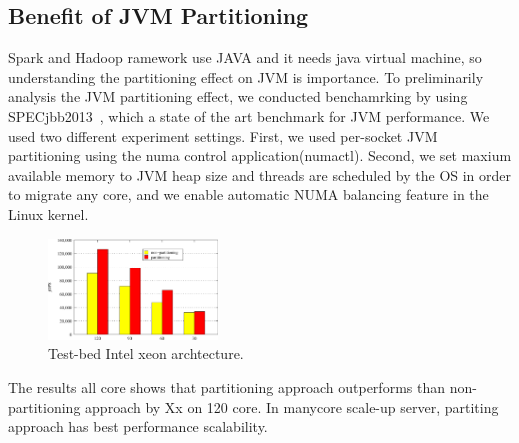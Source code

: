 \fi



\subsection{Benefit of JVM Partitioning}


\ifkor
Spark and Hadoop ramework use JAVA and it needs java virtual machine, so
understanding the partitioning effect on JVM is importance.
To preliminarily analysis the JVM partitioning effect, we conducted
benchamrking by using SPECjbb2013~\cite{PPogue2014SO}, which a state of the art
benchmark for JVM performance.
We used two different experiment settings. First, we used per-socket
JVM partitioning using the numa control application(numactl).
Second, we set maxium available memory to JVM heap size and
threads are scheduled by the OS in order to migrate any core, and we
enable automatic NUMA balancing feature in the Linux kernel.
\else
\fi

\begin{figure}[h]
  \begin{center}
     \includegraphics[width=0.4\textwidth]{graph/SPECjbb2013}
  \end{center}
  \caption{Test-bed Intel xeon archtecture.}
  \label{fig:basic}
\end{figure}

\ifkor

The results all core shows that partitioning approach outperforms than
non-partitioning approach by Xx on 120 core.
In manycore scale-up server, partiting approach has best performance
scalability.
\else
\fi
